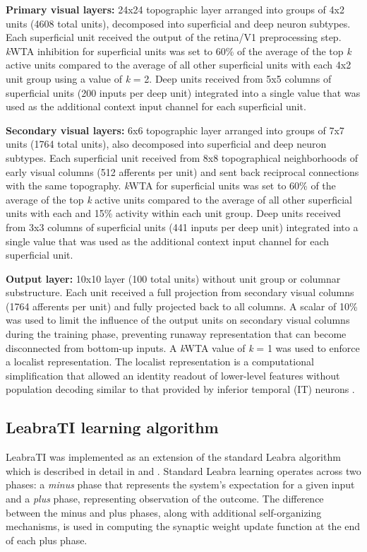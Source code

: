 \documentclass[dwyatte_dissertation.tex]{subfiles}
\begin{document}
\textbf{Primary visual layers:} 24x24 topographic layer arranged into groups of 4x2 units (4608 total units), decomposed into superficial and deep neuron subtypes. Each superficial unit received the output of the retina/V1 preprocessing step. \textit{k}WTA inhibition for superficial units was set to 60\% of the average of the top \textit{k} active units compared to the average of all other superficial units with each 4x2 unit group using a value of \textit{k} = 2. Deep units received from 5x5 columns of superficial units (200 inputs per deep unit) integrated into a single value that was used as the additional context input channel for each superficial unit.

\textbf{Secondary visual layers:} 6x6 topographic layer arranged into groups of 7x7 units (1764 total units), also decomposed into superficial and deep neuron subtypes. Each superficial unit received from 8x8 topographical neighborhoods of early visual columns (512 afferents per unit) and sent back reciprocal connections with the same topography. \textit{k}WTA for superficial units was set to 60\% of the average of the top \textit{k} active units compared to the average of all other superficial units with each and 15\% activity within each unit group. Deep units received from 3x3 columns of superficial units (441 inputs per deep unit) integrated into a single value that was used as the additional context input channel for each superficial unit.

\textbf{Output layer:} 10x10 layer (100 total units) without unit group or columnar substructure. Each unit received a full projection from secondary visual columns (1764 afferents per unit) and fully projected back to all columns. A scalar of 10\% was used to limit the influence of the output units on secondary visual columns during the training phase, preventing runaway representation that can become disconnected from bottom-up inputs. A \textit{k}WTA value of \textit{k} = 1 was used to enforce a localist representation. The localist representation is a computational simplification that allowed an identity readout of lower-level features without population decoding similar to that provided by inferior temporal (IT) neurons  \cite{HungKreimanPoggioEtAl05,LiCoxZoccolanEtAl09}. 

\subsection{LeabraTI learning algorithm}

LeabraTI was implemented as an extension of the standard Leabra algorithm which is described in detail in  and . Standard Leabra learning operates across two phases: a \textit{minus} phase that represents the system's expectation for a given input and a \textit{plus} phase, representing observation of the outcome. The difference between the minus and plus phases, along with additional self-organizing mechanisms, is used in computing the synaptic weight update function at the end of each plus phase. 
\end{document}
